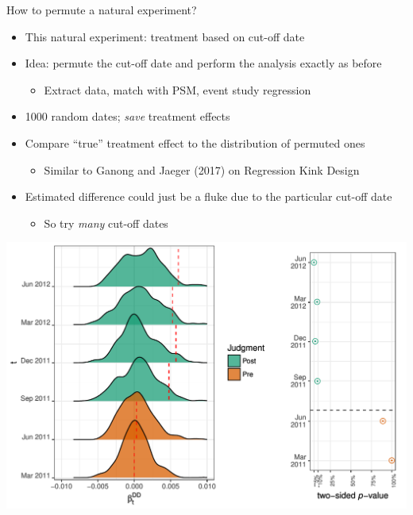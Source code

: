 \documentclass[ignorenonframetext,aspectratio=169]{beamer}
\providecommand{\tightlist}{%
  \setlength{\itemsep}{0pt}\setlength{\parskip}{0pt}}
\begin{document}
\begin{frame}{How to permute a natural experiment?}

\begin{itemize}
\item
  This natural experiment: treatment based on cut-off date
\item
  Idea: permute the cut-off date and perform the analysis exactly as
  before

  \begin{itemize}
  \tightlist
  \item
    Extract data, match with PSM, event study regression
  \end{itemize}
\item
  1000 random dates; \emph{save} treatment effects
\item
  Compare ``true'' treatment effect to the distribution of permuted ones

  \begin{itemize}
  \tightlist
  \item
    Similar to Ganong and Jaeger (2017) on Regression Kink Design
  \end{itemize}
\item
  Estimated difference could just be a fluke due to the particular
  cut-off date

  \begin{itemize}
  \tightlist
  \item
    So try \emph{many} cut-off dates
  \end{itemize}
\end{itemize}

\end{frame}

\begin{frame}{}

\centering\includegraphics[width = 0.8\linewidth]{joy_with_p}

\end{frame}
\end{document}

